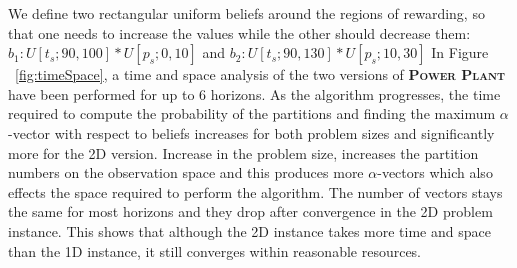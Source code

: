 \documentclass{article} %
\begin{document}
We define two rectangular uniform beliefs around the regions of rewarding, so that one needs to increase the values while the other should decrease them: $b_1: U[t_s;90,100]*U[p_s;0,10]$ and $b_2: U[t_s;90,130]*U[p_s;10,30]$
In Figure ~\ref{fig:timeSpace}, a time and space analysis of
the two versions of \textsc{\bf Power Plant} have been performed for up to 6 horizons. %
As the algorithm progresses, the time required to compute the probability of the partitions and finding the maximum $\alpha$-vector with respect to beliefs increases for both problem sizes and significantly more for the 2D version. %
Increase in the problem size, increases the partition numbers on the observation space and this produces more $\alpha$-vectors which also effects the space required to perform the algorithm. The number of vectors stays the same for most horizons and they drop after convergence in the 2D problem instance. %
This shows that although the 2D instance takes more time and space than the 1D instance, it still converges within reasonable resources.
\end{document}
